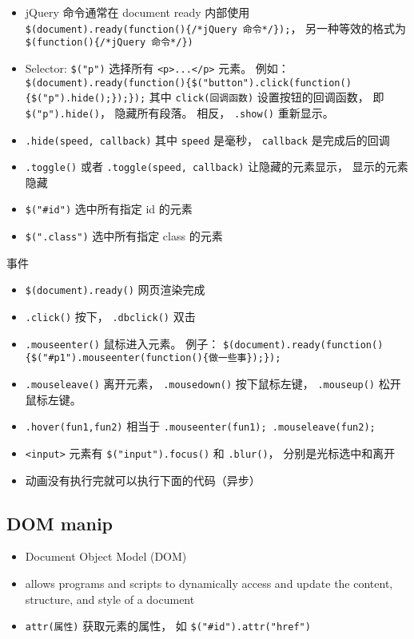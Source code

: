 
\begin{issues}
\issueDraft
\end{issues}


\begin{itemize}
\item jQuery 命令通常在 document ready 内部使用 \verb|$(document).ready(function(){/*jQuery 命令*/});|， 另一种等效的格式为 \verb|$(function(){/*jQuery 命令*/})|
\item Selector: \verb|$("p")| 选择所有 \verb|<p>...</p>| 元素。 例如： \verb|$(document).ready(function(){$("button").click(function(){$("p").hide();});});| 其中 \verb|click(回调函数)| 设置按钮的回调函数， 即 \verb|$("p").hide()|， 隐藏所有段落。 相反， \verb|.show()| 重新显示。
\item \verb|.hide(speed, callback)| 其中 \verb|speed| 是毫秒， \verb|callback| 是完成后的回调
\item \verb|.toggle()| 或者 \verb|.toggle(speed, callback)| 让隐藏的元素显示， 显示的元素隐藏
\item \verb|$("#id")| 选中所有指定 id 的元素
\item \verb|$(".class")| 选中所有指定 class 的元素
\end{itemize}

事件
\begin{itemize}
\item \verb|$(document).ready()| 网页渲染完成
\item \verb|.click()| 按下， \verb|.dbclick()| 双击
\item \verb|.mouseenter()| 鼠标进入元素。 例子： \verb|$(document).ready(function(){$("#p1").mouseenter(function(){做一些事});});|
\item \verb|.mouseleave()| 离开元素， \verb|.mousedown()| 按下鼠标左键， \verb|.mouseup()| 松开鼠标左键。
\item \verb|.hover(fun1,fun2)| 相当于 \verb|.mouseenter(fun1); .mouseleave(fun2);|
\item \verb|<input>| 元素有 \verb|$("input").focus()| 和 \verb|.blur()|， 分别是光标选中和离开
\item 动画没有执行完就可以执行下面的代码（异步）
\end{itemize}

\subsection{DOM manip}
\begin{itemize}
\item Document Object Model (DOM)
\item allows programs and scripts to dynamically access and update the content, structure, and style of a document
\item \verb|attr(属性)| 获取元素的属性， 如 \verb|$("#id").attr("href")|
\end{itemize}

